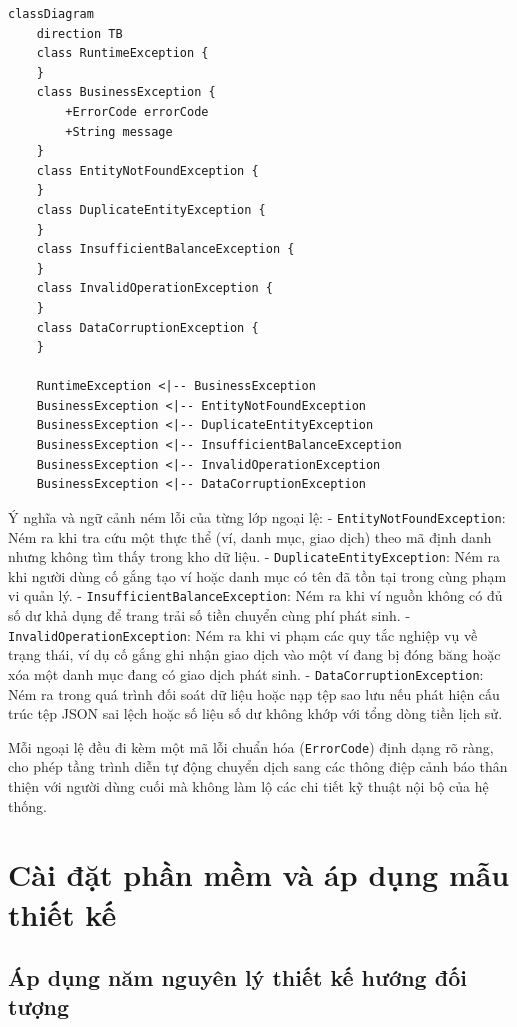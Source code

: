 \documentclass[a4paper,12pt]{report}
\newcommand{\passthrough}[1]{#1}
\begin{document}
\begin{lstlisting}
classDiagram
    direction TB
    class RuntimeException {
    }
    class BusinessException {
        +ErrorCode errorCode
        +String message
    }
    class EntityNotFoundException {
    }
    class DuplicateEntityException {
    }
    class InsufficientBalanceException {
    }
    class InvalidOperationException {
    }
    class DataCorruptionException {
    }

    RuntimeException <|-- BusinessException
    BusinessException <|-- EntityNotFoundException
    BusinessException <|-- DuplicateEntityException
    BusinessException <|-- InsufficientBalanceException
    BusinessException <|-- InvalidOperationException
    BusinessException <|-- DataCorruptionException
\end{lstlisting}

Ý nghĩa và ngữ cảnh ném lỗi của từng lớp ngoại lệ: -
\passthrough{\lstinline!EntityNotFoundException!}: Ném ra khi tra cứu
một thực thể (ví, danh mục, giao dịch) theo mã định danh nhưng không tìm
thấy trong kho dữ liệu. -
\passthrough{\lstinline!DuplicateEntityException!}: Ném ra khi người
dùng cố gắng tạo ví hoặc danh mục có tên đã tồn tại trong cùng phạm vi
quản lý. - \passthrough{\lstinline!InsufficientBalanceException!}: Ném
ra khi ví nguồn không có đủ số dư khả dụng để trang trải số tiền chuyển
cùng phí phát sinh. -
\passthrough{\lstinline!InvalidOperationException!}: Ném ra khi vi phạm
các quy tắc nghiệp vụ về trạng thái, ví dụ cố gắng ghi nhận giao dịch
vào một ví đang bị đóng băng hoặc xóa một danh mục đang có giao dịch
phát sinh. - \passthrough{\lstinline!DataCorruptionException!}: Ném ra
trong quá trình đối soát dữ liệu hoặc nạp tệp sao lưu nếu phát hiện cấu
trúc tệp JSON sai lệch hoặc số liệu số dư không khớp với tổng dòng tiền
lịch sử.

Mỗi ngoại lệ đều đi kèm một mã lỗi chuẩn hóa
(\passthrough{\lstinline!ErrorCode!}) định dạng rõ ràng, cho phép tầng
trình diễn tự động chuyển dịch sang các thông điệp cảnh báo thân thiện
với người dùng cuối mà không làm lộ các chi tiết kỹ thuật nội bộ của hệ
thống.

\chapter{Cài đặt phần mềm và áp dụng mẫu thiết
kế}\label{cuxe0i-ux111ux1eb7t-phux1ea7n-mux1ec1m-vuxe0-uxe1p-dux1ee5ng-mux1eabu-thiux1ebft-kux1ebf}

\section{Áp dụng năm nguyên lý thiết kế hướng đối
tượng}\label{uxe1p-dux1ee5ng-nux103m-nguyuxean-luxfd-thiux1ebft-kux1ebf-hux1b0ux1edbng-ux111ux1ed1i-tux1b0ux1ee3ng}
\end{document}
